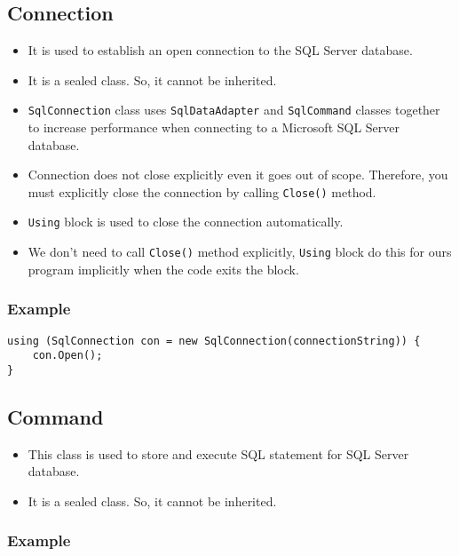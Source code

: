 \subsection{Connection}\label{sec:connection}
\begin{itemize}
	\item It is used to establish an open connection to the SQL Server database. 
	\item It is a sealed class. So, it cannot be inherited. 
	\item \texttt{SqlConnection} class uses \texttt{SqlDataAdapter} and \texttt{SqlCommand} classes together to increase performance when connecting to a Microsoft SQL Server database.
	\item Connection does not close explicitly even it goes out of scope. Therefore, you must explicitly close the connection by calling \texttt{Close()} method.	
	\item \texttt{Using} block is used to close the connection automatically. 
	\item We don't need to call \texttt{Close()} method explicitly, \texttt{Using} block do this for ours program implicitly when the code exits the block.
\end{itemize}

\subsubsection*{Example}
\begin{lstlisting}
using (SqlConnection con = new SqlConnection(connectionString)) {    
	con.Open();         
} 
\end{lstlisting}





\subsection{Command}\label{sec:command}
\begin{itemize}
	\item This class is used to store and execute SQL statement for SQL Server database. 
	\item It is a sealed class. So, it cannot be inherited.
\end{itemize}

\subsubsection*{Example}




